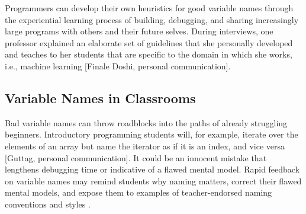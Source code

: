 Programmers can develop their own heuristics for good variable names through the experiential learning process of building, debugging, and sharing increasingly large programs with others and their future selves. During interviews, one professor explained an elaborate set of guidelines that she personally developed and teaches to her students that are specific to the domain in which she works, i.e., machine learning [Finale Doshi, personal communication].

\subsection{Variable Names in Classrooms}
Bad variable names can throw roadblocks into the paths of already struggling beginners. Introductory programming students will, for example, iterate over the elements of an array but name the iterator as if it is an index, and vice versa [Guttag, personal communication]. It could be an innocent mistake that lengthens debugging time or indicative of a flawed mental model. Rapid feedback on variable names may remind students why naming matters, correct their flawed mental models, and expose them to examples of teacher-endorsed naming conventions and styles \cite{ieeeRapidFeedback}.



